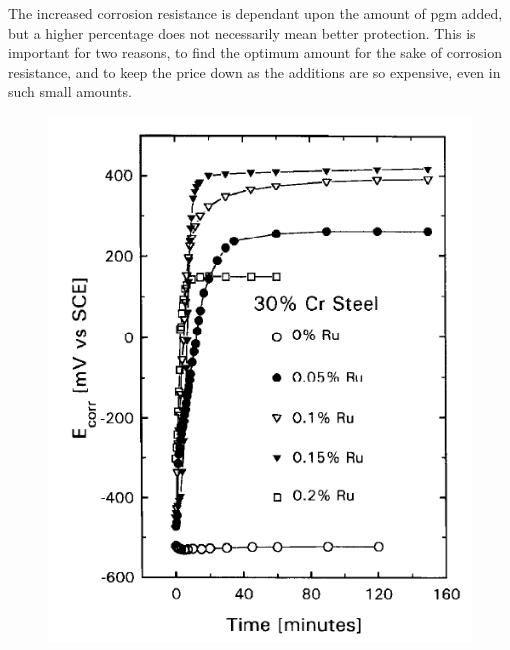 The increased corrosion resistance is dependant upon the amount of \acrshort{pgm} added, but a higher percentage does not necessarily mean better protection.  This is important for two reasons, to find the optimum amount for the sake of corrosion resistance, and to keep the price down as the additions are so expensive, even in such small amounts.

\begin{figure}
\centering
\begin{minipage}{.47\textwidth}
\includegraphics[width=.97\linewidth]{chapters/austenitic_steels_in_nuclear/images/fe30crru.png}
\end{minipage}
\begin{minipage}{.47\textwidth}

\end{minipage}
\end{figure}
